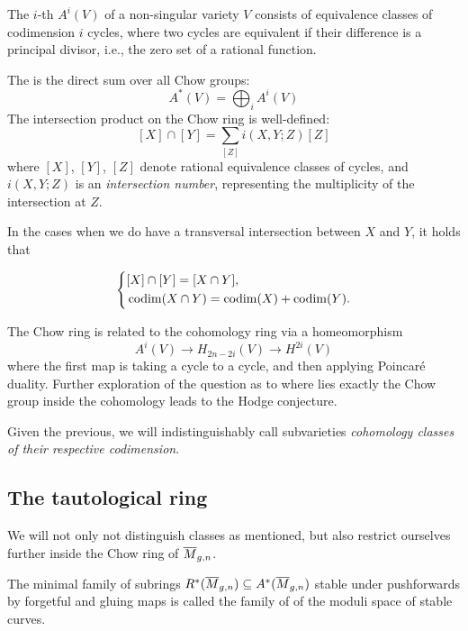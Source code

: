 \documentclass[12pt]{memoir}
\begin{document}
\begin{Def}
    The $i$-th  $A^i(V)$ of a non-singular variety $V$ consists of equivalence classes of codimension $i$ cycles, where two cycles are equivalent if their difference is a principal divisor, i.e., the zero set of a rational function.
\end{Def}

The  is the direct sum over all Chow groups:
$$A^\ast(V) = \bigoplus_i A^i(V)$$
The intersection product on the Chow ring is well-defined:
$$[X] \cap [Y] = \sum_{[Z]} i(X, Y; Z) [Z]$$
where $[X]$, $[Y]$, $[Z]$ denote rational equivalence classes of cycles, and $i(X, Y; Z)$ is an \emph{intersection number}, representing the multiplicity of the intersection at $Z$.

\begin{Rmk}
In the cases when we do have a transversal intersection between $X$ and $Y$, it holds that 

$$
\left\lbrace
\begin{aligned}
&[X]\cap[Y]=[X\cap Y],\\
&\operatorname{codim}(X\cap Y)=\operatorname{codim}(X)+\operatorname{codim}(Y).
\end{aligned}
\right.
$$

\end{Rmk}

\begin{Rmk}
    The Chow ring is related to the cohomology ring via a homeomorphism 
    $$A^i(V)\to H_{2n-2i}(V)\to H^{2i}(V)$$
    where the first map is taking a cycle to a cycle, and then applying Poincaré duality. Further exploration of the question as to where lies exactly the Chow group inside the cohomology leads to the Hodge conjecture.
\end{Rmk}

Given the previous, we will indistinguishably call subvarieties \emph{cohomology classes of their respective codimension}.

\subsection{The tautological ring}

We will not only not distinguish classes as mentioned, but also restrict ourselves further inside the Chow ring of $\overline M_{g,n}$. 

\begin{Def}
The minimal family of subrings $R^\ast(\overline M_{g,n})\subseteq A^\ast(\overline M_{g,n})$ stable under pushforwards by forgetful and gluing maps is called the family of  of the moduli space of stable curves.
\end{Def}
\end{document}
